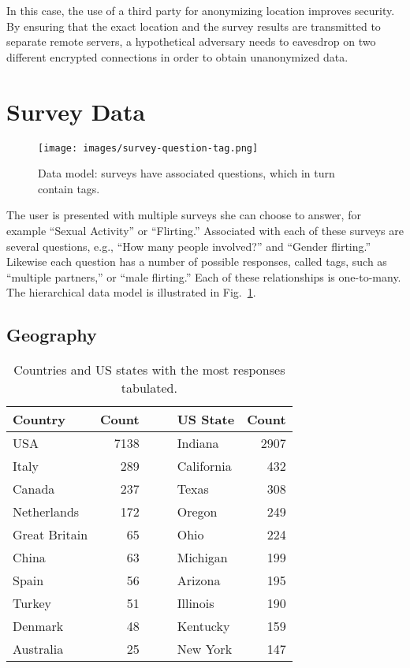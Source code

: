 \documentclass{sigchi}
\begin{document}
In this case, the use of a third party for anonymizing location improves security. By ensuring that the exact location and the survey results are transmitted to separate remote servers, a hypothetical adversary needs to eavesdrop on two different encrypted connections in order to obtain unanonymized data.

\section{Survey Data}
\begin{figure}
\texttt{[image: images/survey-question-tag.png]}
\caption{Data model: surveys have associated questions, which in turn contain tags.}
\label{fig:structure}
\end{figure}
The user is presented with multiple surveys she can choose to answer, for example ``Sexual Activity'' or ``Flirting.'' Associated with each of these surveys are several questions, e.g., ``How many people involved?'' and ``Gender flirting.'' Likewise each question has a number of possible responses, called tags, such as ``multiple partners,'' or ``male flirting.'' Each of these relationships is one-to-many. The hierarchical data model is illustrated in Fig.~\ref{fig:structure}.

\subsection{Geography}

\begin{table}
\caption{Countries and US states with the most responses tabulated.}
\centering
\begin{tabular}{lrp{0.1in}|p{0.1in}lr}
\hline
\textbf{Country} & \textbf{Count} &&& \textbf{US State} & \textbf{Count} \\
\hline
USA & 7138 &&& Indiana    & 2907\\ 
Italy & 289 &&& California &  432\\ 
Canada & 237 &&& Texas      &  308\\ 
Netherlands & 172 &&& Oregon     &  249\\ 
Great Britain & 65 &&& Ohio       &  224\\ 
China & 63 &&& Michigan    &  199\\ 
Spain & 56 &&& Arizona   &  195\\ 
Turkey & 51 &&& Illinois   &  190\\ 
Denmark & 48 &&& Kentucky   &  159\\ 
Australia & 25 &&& New York    &  147\\ 
\hline
\end{tabular}
\label{tab:geo}
\end{table}
\end{document}
